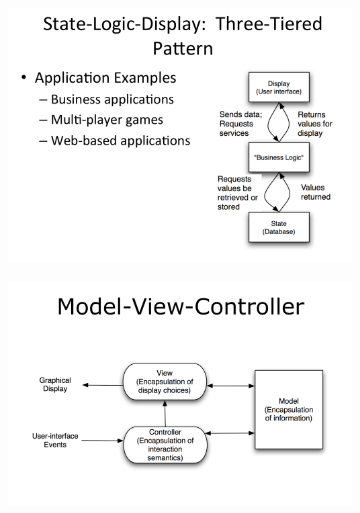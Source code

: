 \documentclass[a4paper]{article}
\begin{document}
\begin{figure}[H]
\hskip-2.5cm\begin{subfigure}{1.2\textwidth}
  \includegraphics[width=1.2\linewidth]
  {images/3-SLD-pattern}
\end{subfigure}
\end{figure}

\begin{figure}[H]
\hskip-2.5cm\begin{subfigure}{1.2\textwidth}
  \includegraphics[width=1.2\linewidth]
  {images/3-model-view-controller.png}
\end{subfigure}
\end{figure}
\end{document}

